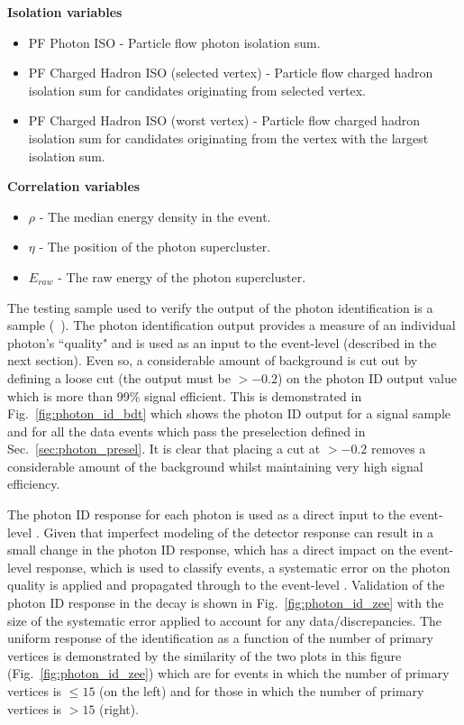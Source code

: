 \noindent\textbf{Isolation variables}
\begin{itemize}
  \item PF Photon ISO - Particle flow photon isolation sum.
  \item PF Charged Hadron ISO (selected vertex) - Particle flow charged hadron isolation sum for candidates originating from selected vertex.
  \item PF Charged Hadron ISO (worst vertex) - Particle flow charged hadron isolation sum for candidates originating from the vertex with the largest isolation sum.
\end{itemize}

\noindent\textbf{Correlation variables}
\begin{itemize}
  \item $\rho$ - The median energy density in the event.
  \item $\eta$ - The \eta position of the photon supercluster.
  \item $E_{raw}$ - The raw energy of the photon supercluster.
\end{itemize}

The testing sample used to verify the output of the photon identification \BDT is a \MC \Hgg sample (~\GeV). The photon identification \BDT output provides a measure of an individual photon's ``quality" and is used as an input to the event-level \BDT (described in the next section). Even so, a considerable amount of background is cut out by defining a loose cut (the \BDT output must be $>-0.2$) on the photon ID \BDT output value which is more than 99\% signal efficient. This is demonstrated in Fig.~\ref{fig:photon_id_bdt} which shows the photon ID \BDT output for a \Hgg signal \MC sample and for all the data events which pass the preselection defined in Sec.~\ref{sec:photon_presel}. It is clear that placing a cut at $>-0.2$ removes a considerable amount of the background whilst maintaining very high signal efficiency. 

The photon ID \BDT response for each photon is used as a direct input to the event-level \MVA. Given that imperfect modeling of the detector response can result in a small change in the photon ID response, which has a direct impact on the event-level \MVA response, which is used to classify events, a systematic error on the photon quality is applied and propagated through to the event-level \MVA. Validation of the photon ID \BDT response in the \Zee decay is shown in Fig.~\ref{fig:photon_id_zee} with the size of the systematic error applied to account for any data/\MC discrepancies. The uniform response of the identification as a function of the number of primary vertices is demonstrated by the similarity of the two plots in this figure (Fig.~\ref{fig:photon_id_zee}) which are for events in which the number of primary vertices is $\leq 15$ (on the left) and for those in which the number of primary vertices is $>15$ (right).

